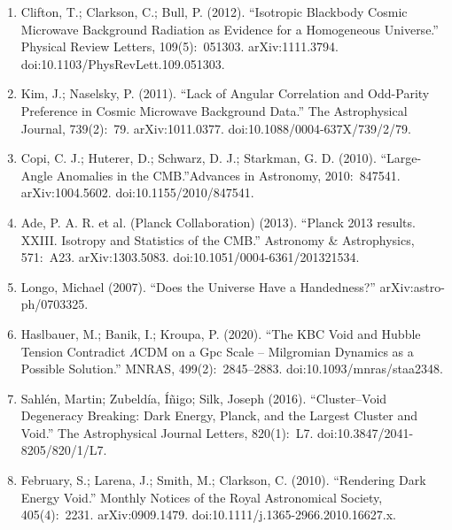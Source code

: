 \begin{enumerate}
    \item Clifton, T.; Clarkson, C.; Bull, P. (2012). “Isotropic Blackbody Cosmic Microwave Background Radiation as Evidence for a Homogeneous Universe.” Physical Review Letters, 109(5):~051303. arXiv:1111.3794. doi:10.1103/PhysRevLett.109.051303.
    \item Kim, J.; Naselsky, P. (2011). “Lack of Angular Correlation and Odd-Parity Preference in Cosmic Microwave Background Data.” The Astrophysical Journal, 739(2):~79. arXiv:1011.0377. doi:10.1088/0004-637X/739/2/79.
    \item Copi, C. J.; Huterer, D.; Schwarz, D. J.; Starkman, G. D. (2010). “Large-Angle Anomalies in the CMB.”Advances in Astronomy, 2010:~847541. arXiv:1004.5602. doi:10.1155/2010/847541.
    \item Ade, P. A. R. et al. (Planck Collaboration) (2013). “Planck 2013 results. XXIII. Isotropy and Statistics of the CMB.” Astronomy \& Astrophysics, 571:~A23. arXiv:1303.5083. doi:10.1051/0004-6361/201321534.
    \item Longo, Michael (2007). “Does the Universe Have a Handedness?” arXiv:astro-ph/0703325.
    \item Haslbauer, M.; Banik, I.; Kroupa, P. (2020). “The KBC Void and Hubble Tension Contradict $\Lambda$CDM on a Gpc Scale – Milgromian Dynamics as a Possible Solution.” MNRAS, 499(2):~2845–2883. doi:10.1093/mnras/staa2348.
    \item Sahlén, Martin; Zubeldía, Íñigo; Silk, Joseph (2016). “Cluster–Void Degeneracy Breaking: Dark Energy, Planck, and the Largest Cluster and Void.” The Astrophysical Journal Letters, 820(1):~L7. doi:10.3847/2041-8205/820/1/L7.
    \item February, S.; Larena, J.; Smith, M.; Clarkson, C. (2010). “Rendering Dark Energy Void.” Monthly Notices of the Royal Astronomical Society, 405(4):~2231. arXiv:0909.1479. doi:10.1111/j.1365-2966.2010.16627.x.
\end{enumerate}

